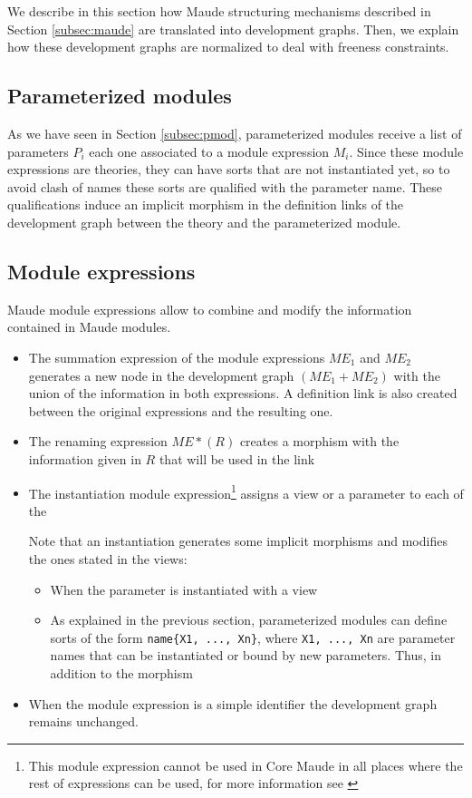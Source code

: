 
We describe in this section how Maude structuring mechanisms
described in Section \ref{subsec:maude}
are translated into development graphs. Then, we explain how these development
graphs are normalized to deal with freeness constraints.

\subsection{Parameterized modules}

As we have seen in Section \ref{subsec:pmod}, parameterized modules 
receive a list of parameters $P_i$ each one associated to a module
expression $M_i$. Since these module expressions are theories, they
can have sorts that are not instantiated yet, so to avoid clash of
names these sorts are qualified with the parameter name. These
qualifications induce an implicit morphism in the definition links
of the development graph between the theory and the parameterized
module.

\subsection{Module expressions}\label{subsec:me}

Maude module expressions allow to combine and modify the information
contained in Maude modules.

\begin{itemize}
\item The summation expression of the module expressions $\mathit{ME}_1$ and
$\mathit{ME}_2$ generates a new node in the development graph
$(\mathit{ME}_1 + \mathit{ME}_2)$ with
the union of the information in both expressions. A definition link
is also created between the original expressions and the resulting one.
\item The renaming expression $\mathit{ME} * (R)$ creates a morphism with
the information given in $R$ that will be used in the link 
\item The instantiation module expression\footnote{This module expression
cannot be used in Core Maude in all places where the rest of expressions
can be used, for more information see \cite{maude-book}} assigns a view
or a parameter to each of the

Note that an instantiation generates some implicit morphisms and modifies
the ones stated in the views:
\begin{itemize}
\item When the parameter is instantiated with a view
\item As explained in the previous section, parameterized modules can
define sorts of the form \verb"name{X1, ..., Xn}", where \verb"X1, ..., Xn"
are parameter names that can be instantiated or bound by new parameters.
Thus, in addition to the morphism
\end{itemize}

\item When the module expression is a simple identifier the development
graph remains unchanged.
\end{itemize}

